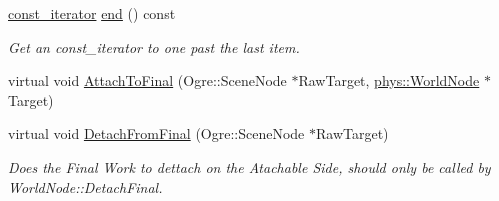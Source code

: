 \begin{DoxyCompactItemize}
\hyperlink{classphys_1_1WorldNode_a76139100e549fd31310cd1bed75338ba}{const\_\-iterator} \hyperlink{classphys_1_1WorldNode_a25a2a1866850812cab926c31598344a2}{end} () const 
\begin{DoxyCompactList}\small\item\em Get an const\_\-iterator to one past the last item. \item\end{DoxyCompactList}\item 
virtual void \hyperlink{classphys_1_1WorldNode_a398d3202233431eb3a2f110bd761f7a0}{AttachToFinal} (Ogre::SceneNode $\ast$RawTarget, \hyperlink{classphys_1_1WorldNode}{phys::WorldNode} $\ast$Target)
\item 
virtual void \hyperlink{classphys_1_1WorldNode_abab10f16b3d49c93a35443523cdb5a4f}{DetachFromFinal} (Ogre::SceneNode $\ast$RawTarget)
\begin{DoxyCompactList}\small\item\em Does the Final Work to dettach on the Atachable Side, should only be called by WorldNode::DetachFinal. \item\end{DoxyCompactList}\end{DoxyCompactItemize}
